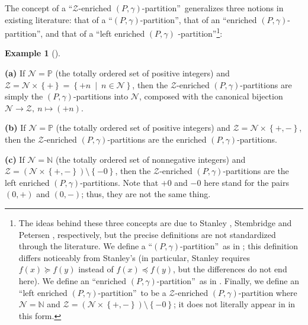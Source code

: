 \documentclass[numbers=enddot,12pt,final,onecolumn,notitlepage]{scrartcl}%
\theoremstyle{definition}
\newtheorem{exmp}[theo]{Example}
\newenvironment{example}[1][]
{\begin{exmp}[#1]\begin{leftbar}}
{\end{leftbar}\end{exmp}}
\begin{document}
The concept of a \textquotedblleft$\mathcal{Z}$-enriched $\left(
P,\gamma\right)  $-partition\textquotedblright\ generalizes three notions in
existing literature: that of a \textquotedblleft$\left(  P,\gamma\right)
$-partition\textquotedblright, that of an \textquotedblleft enriched $\left(
P,\gamma\right)  $-partition\textquotedblright, and that of a
\textquotedblleft left enriched $\left(  P,\gamma\right)  $%
-partition\textquotedblright\footnote{The ideas behind these three concepts
are due to Stanley \cite{Stanle72}, Stembridge \cite[\S 2]{Stembr97} and
Petersen \cite{Peters05}, respectively, but the precise definitions are not
standardized through the literature. We define a \textquotedblleft$\left(
P,\gamma\right)  $-partition\textquotedblright\ as in \cite[\S 1.1]{Stembr97};
this definition differs noticeably from Stanley's (in particular, Stanley
requires $f\left(  x\right)  \succcurlyeq f\left(  y\right)  $ instead of
$f\left(  x\right)  \preccurlyeq f\left(  y\right)  $, but the differences do
not end here). We define an \textquotedblleft enriched $\left(  P,\gamma
\right)  $-partition\textquotedblright\ as in \cite[\S 2]{Stembr97}. Finally,
we define an \textquotedblleft left enriched $\left(  P,\gamma\right)
$-partition\textquotedblright\ to be a $\mathcal{Z}$-enriched $\left(
P,\gamma\right)  $-partition where $\mathcal{N}=\mathbb{N}$ and $\mathcal{Z}%
=\left(  \mathcal{N}\times\left\{  +,-\right\}  \right)  \setminus\left\{
-0\right\}  $; it does not literally appear in \cite[Definition 4.1]{Peters05}
in this form.}:

\begin{example}
\label{exa.ambivPp.abc}\textbf{(a)} If $\mathcal{N}=\mathbb{P}$ (the totally
ordered set of positive integers) and $\mathcal{Z}=\mathcal{N}\times\left\{
+\right\}  =\left\{  +n\ \mid\ n\in\mathcal{N}\right\}  $, then the
$\mathcal{Z}$-enriched $\left(  P,\gamma\right)  $-partitions are simply the
$\left(  P,\gamma\right)  $-partitions into $\mathcal{N}$, composed with the
canonical bijection $\mathcal{N}\rightarrow\mathcal{Z},\ n\mapsto\left(
+n\right)  $.

\textbf{(b)} If $\mathcal{N}=\mathbb{P}$ (the totally ordered set of positive
integers) and $\mathcal{Z}=\mathcal{N}\times\left\{  +,-\right\}  $, then the
$\mathcal{Z}$-enriched $\left(  P,\gamma\right)  $-partitions are the enriched
$\left(  P,\gamma\right)  $-partitions.

\textbf{(c)} If $\mathcal{N}=\mathbb{N}$ (the totally ordered set of
nonnegative integers) and $\mathcal{Z}=\left(  \mathcal{N}\times\left\{
+,-\right\}  \right)  \setminus\left\{  -0\right\}  $, then the $\mathcal{Z}%
$-enriched $\left(  P,\gamma\right)  $-partitions are the left enriched
$\left(  P,\gamma\right)  $-partitions. Note that $+0$ and $-0$ here stand for
the pairs $\left(  0,+\right)  $ and $\left(  0,-\right)  $; thus, they are
not the same thing.
\end{example}
\end{document}
